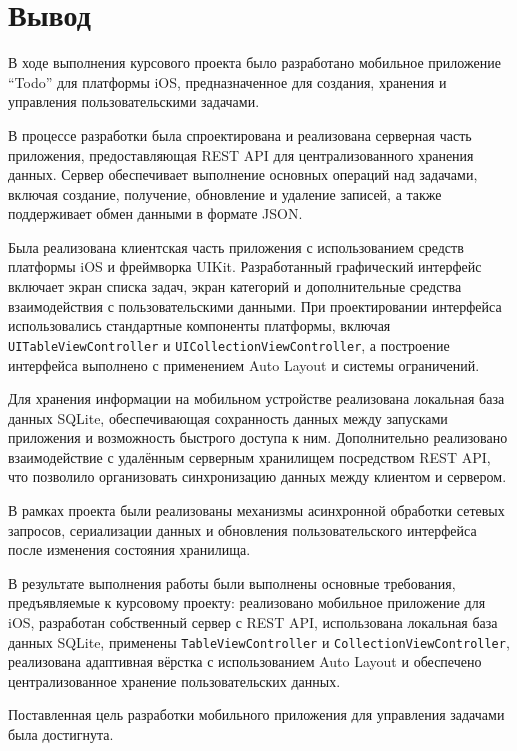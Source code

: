\documentclass[14pt,a4paper]{extarticle}
\begin{document}
\section{Вывод}

В ходе выполнения курсового проекта было разработано мобильное приложение ``Todo'' для платформы iOS, предназначенное для создания, хранения и управления пользовательскими задачами.

В процессе разработки была спроектирована и реализована серверная часть приложения, предоставляющая REST API для централизованного хранения данных. Сервер обеспечивает выполнение основных операций над задачами, включая создание, получение, обновление и удаление записей, а также поддерживает обмен данными в формате JSON.

Была реализована клиентская часть приложения с использованием средств платформы iOS и фреймворка UIKit. Разработанный графический интерфейс включает экран списка задач, экран категорий и дополнительные средства взаимодействия с пользовательскими данными. При проектировании интерфейса использовались стандартные компоненты платформы, включая \texttt{UITableViewController} и \texttt{UICollectionViewController}, а построение интерфейса выполнено с применением Auto Layout и системы ограничений.

Для хранения информации на мобильном устройстве реализована локальная база данных SQLite, обеспечивающая сохранность данных между запусками приложения и возможность быстрого доступа к ним. Дополнительно реализовано взаимодействие с удалённым серверным хранилищем посредством REST API, что позволило организовать синхронизацию данных между клиентом и сервером.

В рамках проекта были реализованы механизмы асинхронной обработки сетевых запросов, сериализации данных и обновления пользовательского интерфейса после изменения состояния хранилища.

В результате выполнения работы были выполнены основные требования, предъявляемые к курсовому проекту: реализовано мобильное приложение для iOS, разработан собственный сервер с REST API, использована локальная база данных SQLite, применены \texttt{TableViewController} и \texttt{CollectionViewController}, реализована адаптивная вёрстка с использованием Auto Layout и обеспечено централизованное хранение пользовательских данных.

Поставленная цель разработки мобильного приложения для управления задачами была достигнута.
\end{document}
